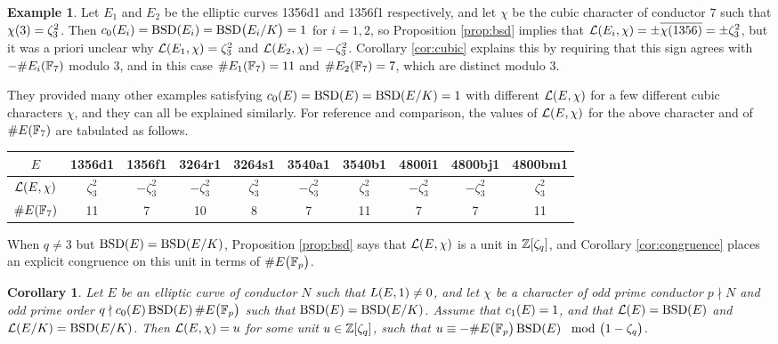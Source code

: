 \documentclass{article}
\theoremstyle{plain}
\newtheorem{corollary}[n]{Corollary}
\theoremstyle{definition}
\newtheorem{example}[n]{Example}
\newcommand{\BSD}{\operatorname{BSD}}
\newcommand{\FF}{\mathbb{F}}
\newcommand{\LLL}{\mathcal{L}}
\newcommand{\ZZ}{\mathbb{Z}}
\newcommand{\br}{\!\del}
\begin{document}
\pagebreak

\begin{example}
Let $ E_1 $ and $ E_2 $ be the elliptic curves 1356d1 and 1356f1 respectively, and let $ \chi $ be the cubic character of conductor $ 7 $ such that $ \chi\br{3} = \zeta_3^2 $. Then $ c_0\br{E_i} = \BSD\br{E_i} = \BSD\br{E_i / K} = 1 $ for $ i = 1, 2 $, so Proposition \ref{prop:bsd} implies that $ \LLL\br{E_i, \chi} = \pm\overline{\chi\br{1356}} = \pm\zeta_3^2 $, but it was a priori unclear why $ \LLL\br{E_1, \chi} = \zeta_3^2 $ and $ \LLL\br{E_2, \chi} = -\zeta_3^2 $. Corollary \ref{cor:cubic} explains this by requiring that this sign agrees with $ -\#E_i\br{\FF_7} $ modulo $ 3 $, and in this case $ \#E_1\br{\FF_7} = 11 $ and $ \#E_2\br{\FF_7} = 7 $, which are distinct modulo $ 3 $.

They provided many other examples satisfying $ c_0\br{E} = \BSD\br{E} = \BSD\br[0]{E / K} = 1 $ with different $ \LLL\br{E, \chi} $ for a few different cubic characters $ \chi $, and they can all be explained similarly. For reference and comparison, the values of $ \LLL\br{E, \chi} $ for the above character and of $ \#E\br{\FF_7} $ are tabulated as follows.

\vspace{0.2cm}

\begin{tabular}{|c|cc|cc|cc|ccc|}
\hline
$ E $ & 1356d1 & 1356f1 & 3264r1 & 3264s1 & 3540a1 & 3540b1 & 4800i1 & 4800bj1 & 4800bm1 \\
\hline
$ \LLL\br{E, \chi} $ & $ \zeta_3^2 $ & $ -\zeta_3^2 $ & $ -\zeta_3^2 $ & $ \zeta_3^2 $ & $ -\zeta_3^2 $ & $ \zeta_3^2 $ & $ -\zeta_3^2 $ & $ -\zeta_3^2 $ & $ \zeta_3^2 $ \\
\hline
$ \#E\br{\FF_7} $ & 11 & 7 & 10 & 8 & 7 & 11 & 7 & 7 & 11 \\
\hline
\end{tabular}
\end{example}

When $ q \ne 3 $ but $ \BSD\br{E} = \BSD\br[0]{E / K} $, Proposition \ref{prop:bsd} says that $ \LLL\br{E, \chi} $ is a unit in $ \ZZ\sbr[0]{\zeta_q} $, and Corollary \ref{cor:congruence} places an explicit congruence on this unit in terms of $ \#E\br{\FF_p} $.

\begin{corollary}
\label{cor:unit}
Let $ E $ be an elliptic curve of conductor $ N $ such that $ L\br{E, 1} \ne 0 $, and let $ \chi $ be a character of odd prime conductor $ p \nmid N $ and odd prime order $ q \nmid c_0\br{E}\BSD\br{E}\#E\br{\FF_p} $ such that $ \BSD\br{E} = \BSD\br[0]{E / K} $. Assume that $ c_1\br{E} = 1 $, and that $ \LLL\br{E} = \BSD\br{E} $ and $ \LLL\br[0]{E / K} = \BSD\br[0]{E / K} $. Then $ \LLL\br{E, \chi} = u $ for some unit $ u \in \ZZ\sbr[0]{\zeta_q} $, such that $ u \equiv -\#E\br{\FF_p}\BSD\br{E} \mod \br{1 - \zeta_q} $.
\end{corollary}
\end{document}

